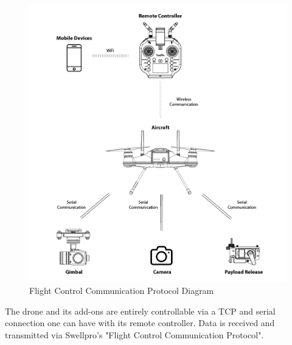 \begin{figure}[h]
\centering
\includegraphics[scale=1.1]{070_design/chosendrone/22_controldiagram.png}
\caption{Flight Control Communication Protocol Diagram \cite{swellpronotion}}
\end{figure}

The drone and its add-ons are entirely controllable via a \gls{TCP} and serial connection one can have with its remote controller. Data is received and transmitted via Swellpro's "Flight Control Communication Protocol". \cite{swellpronotion}